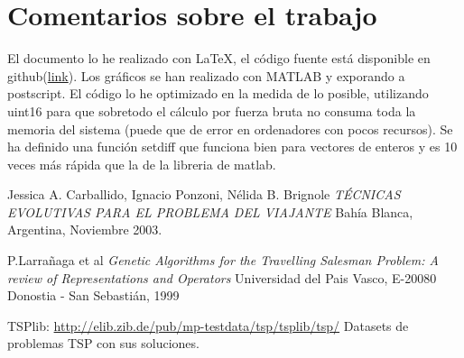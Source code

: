\documentclass[10pt]{article}
\begin{document}
\section{Comentarios sobre el trabajo}
El documento lo he realizado con \LaTeX, el código fuente está disponible en github(\href{https://github.com/Ameb/LaTeX-Projects}{link}). Los gráficos se han realizado con MATLAB y exporando a postscript. El código lo he optimizado en la medida de lo posible, utilizando uint16 para que sobretodo el cálculo por fuerza bruta no consuma toda la memoria del sistema (puede que de error en ordenadores con pocos recursos). Se ha definido una función setdiff que funciona bien para vectores de enteros y es 10 veces más rápida que la de la libreria de matlab.
\begin{thebibliography}{1}
 	 Jessica A. Carballido, Ignacio Ponzoni, Nélida B. Brignole {\em 
	TÉCNICAS EVOLUTIVAS PARA EL PROBLEMA DEL VIAJANTE} Bahía Blanca, Argentina, Noviembre 2003.
 	
 	  P.Larrañaga et al {\em Genetic Algorithms for the Travelling Salesman Problem: A review of Representations and Operators} Universidad del Pais Vasco, E-20080 Donostia - San Sebastián, 1999
 	
 	 TSPlib: \url{http://elib.zib.de/pub/mp-testdata/tsp/tsplib/tsp/} Datasets de problemas TSP con sus soluciones.
\end{thebibliography}
\end{document}
